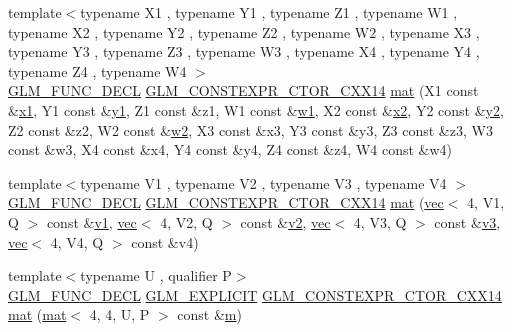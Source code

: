 \begin{DoxyCompactItemize}
\item 
{\footnotesize template$<$typename X1 , typename Y1 , typename Z1 , typename W1 , typename X2 , typename Y2 , typename Z2 , typename W2 , typename X3 , typename Y3 , typename Z3 , typename W3 , typename X4 , typename Y4 , typename Z4 , typename W4 $>$ }\\\hyperlink{setup_8hpp_ab2d052de21a70539923e9bcbf6e83a51}{G\+L\+M\+\_\+\+F\+U\+N\+C\+\_\+\+D\+E\+CL} \hyperlink{setup_8hpp_a0900f9145e68bf6061b6f5e7be3fa751}{G\+L\+M\+\_\+\+C\+O\+N\+S\+T\+E\+X\+P\+R\+\_\+\+C\+T\+O\+R\+\_\+\+C\+X\+X14} \hyperlink{structglm_1_1mat_3_014_00_014_00_01_t_00_01_q_01_4_a17ec7d9bde054dde9908c44c56eccf95}{mat} (X1 const \&\hyperlink{_s_d_l__opengl__glext_8h_a49825216c96caaeb09237b36651181c5}{x1}, Y1 const \&\hyperlink{_s_d_l__opengl__glext_8h_a3af6c78fcdfccea028a5878bc747ef39}{y1}, Z1 const \&z1, W1 const \&\hyperlink{_s_d_l__opengl__glext_8h_ab5b747bf5adb1f9134337c30b9a4ce84}{w1}, X2 const \&\hyperlink{_s_d_l__opengl__glext_8h_a7b907a03236685c534d89d604cff23c8}{x2}, Y2 const \&\hyperlink{_s_d_l__opengl__glext_8h_a2be1135ed68e8d80fa9e130c7814f8c2}{y2}, Z2 const \&z2, W2 const \&\hyperlink{_s_d_l__opengl__glext_8h_a1ca5aca787be24213d9591fdf074b094}{w2}, X3 const \&x3, Y3 const \&y3, Z3 const \&z3, W3 const \&w3, X4 const \&x4, Y4 const \&y4, Z4 const \&z4, W4 const \&w4)
\item 
{\footnotesize template$<$typename V1 , typename V2 , typename V3 , typename V4 $>$ }\\\hyperlink{setup_8hpp_ab2d052de21a70539923e9bcbf6e83a51}{G\+L\+M\+\_\+\+F\+U\+N\+C\+\_\+\+D\+E\+CL} \hyperlink{setup_8hpp_a0900f9145e68bf6061b6f5e7be3fa751}{G\+L\+M\+\_\+\+C\+O\+N\+S\+T\+E\+X\+P\+R\+\_\+\+C\+T\+O\+R\+\_\+\+C\+X\+X14} \hyperlink{structglm_1_1mat_3_014_00_014_00_01_t_00_01_q_01_4_a5321c85fc84ae012f0f05976555d00b0}{mat} (\hyperlink{structglm_1_1vec}{vec}$<$ 4, V1, Q $>$ const \&\hyperlink{_s_d_l__opengl__glext_8h_a435c176a02c061b43e19bdf7c86cceae}{v1}, \hyperlink{structglm_1_1vec}{vec}$<$ 4, V2, Q $>$ const \&\hyperlink{_s_d_l__opengl__glext_8h_a0928f6d0f0f794ba000a21dfae422136}{v2}, \hyperlink{structglm_1_1vec}{vec}$<$ 4, V3, Q $>$ const \&\hyperlink{_s_d_l__opengl__glext_8h_acc806b31cbf466ceba6555983d8b814d}{v3}, \hyperlink{structglm_1_1vec}{vec}$<$ 4, V4, Q $>$ const \&v4)
\item 
{\footnotesize template$<$typename U , qualifier P$>$ }\\\hyperlink{setup_8hpp_ab2d052de21a70539923e9bcbf6e83a51}{G\+L\+M\+\_\+\+F\+U\+N\+C\+\_\+\+D\+E\+CL} \hyperlink{setup_8hpp_a6c74f5a5e7b134ab69023ff9a30d4d5d}{G\+L\+M\+\_\+\+E\+X\+P\+L\+I\+C\+IT} \hyperlink{setup_8hpp_a0900f9145e68bf6061b6f5e7be3fa751}{G\+L\+M\+\_\+\+C\+O\+N\+S\+T\+E\+X\+P\+R\+\_\+\+C\+T\+O\+R\+\_\+\+C\+X\+X14} \hyperlink{structglm_1_1mat_3_014_00_014_00_01_t_00_01_q_01_4_a72a3e030050c4da5ee1d208726898e70}{mat} (\hyperlink{structglm_1_1mat}{mat}$<$ 4, 4, U, P $>$ const \&\hyperlink{_s_d_l__opengl__glext_8h_af593500c283bf1a787a6f947f503a5c2}{m})

\end{DoxyCompactItemize}
